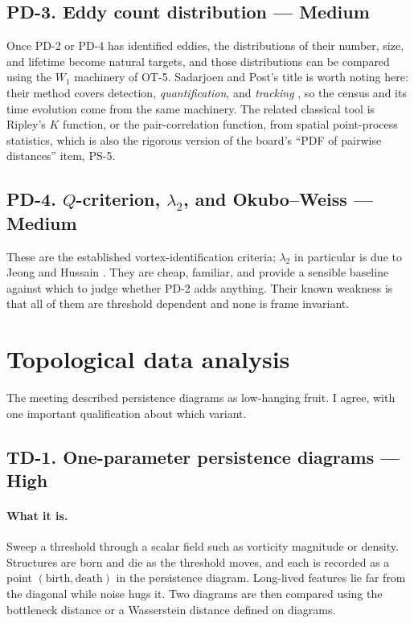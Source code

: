 \documentclass[11pt]{article}
\newcommand{\High}{\textbf{High}}
\newcommand{\Med}{Medium}
\begin{document}
\subsection{PD-3. Eddy count distribution --- \Med{}}

Once PD-2 or PD-4 has identified eddies, the distributions of their number, size, and
lifetime become natural targets, and those distributions can be compared using the $W_1$
machinery of OT-5. Sadarjoen and Post's title is worth noting here: their method covers
detection, \emph{quantification}, and \emph{tracking} \cite{sadarjoen2000}, so the census
and its time evolution come from the same machinery. The related classical tool is Ripley's
$K$ function, or the pair-correlation function, from spatial point-process statistics, which
is also the rigorous version of the board's ``PDF of pairwise distances'' item, PS-5.

\subsection{PD-4. $Q$-criterion, $\lambda_2$, and Okubo--Weiss --- \Med{}}

These are the established vortex-identification criteria; $\lambda_2$ in particular is due
to Jeong and Hussain \cite{jeonghussain1995}. They are cheap, familiar, and provide a
sensible baseline against which to judge whether PD-2 adds anything. Their known weakness is
that all of them are threshold dependent and none is frame invariant.

\section{Topological data analysis}

The meeting described persistence diagrams as low-hanging fruit. I agree, with one important
qualification about which variant.

\subsection{TD-1. One-parameter persistence diagrams --- \High{}}

\paragraph{What it is.} Sweep a threshold through a scalar field such as vorticity magnitude
or density. Structures are born and die as the threshold moves, and each is recorded as a
point $(\text{birth}, \text{death})$ in the persistence diagram. Long-lived features lie far
from the diagonal while noise hugs it. Two diagrams are then compared using the bottleneck
distance or a Wasserstein distance defined on diagrams.
\end{document}
